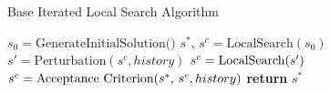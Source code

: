 \begin{algorithm}[ht]
    \caption{Base Iterated Local Search Algorithm}\label{alg:base_ILS}
    \begin{algorithmic}[1]
        \State $s_0 = \text{GenerateInitialSolution()}$
        \State $s^*,\,s^c = \text{LocalSearch}(s_0)$
         
        \State $s'  = \text{Perturbation}(s^c, history)$
        \State $s\sp{c}  = \text{LocalSearch}(s\sp{\prime})$
        \State $s^c = \text{Acceptance Criterion}(s^*,\,s\sp{c}, history)$
        \EndWhile
        \State \textbf{return} $s^*$
        \EndProcedure
    \end{algorithmic}
\end{algorithm}